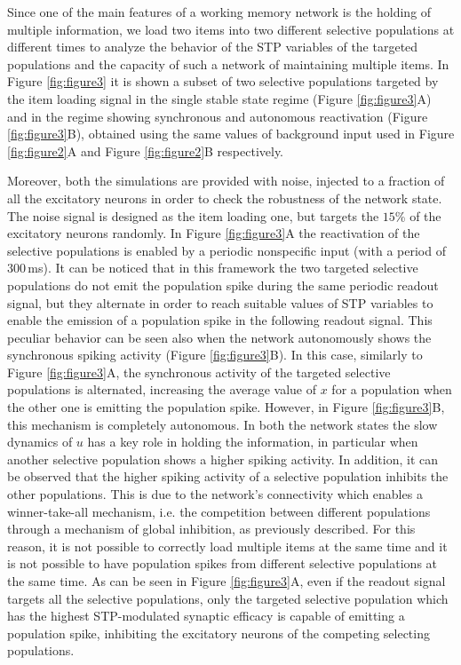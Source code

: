 \documentclass[a4paper, 12pt, twoside, openright]{book}
\begin{document}
Since one of the main features of a working memory network is the holding of multiple information, we load two items into two different selective populations at different times to analyze the behavior of the STP variables of the targeted populations and the capacity of such a network of maintaining multiple items. In Figure \ref{fig:figure3} it is shown a subset of two selective populations targeted by the item loading signal in the single stable state regime (Figure \ref{fig:figure3}A) and in the regime showing synchronous and autonomous reactivation (Figure \ref{fig:figure3}B), obtained using the same values of background input used in Figure \ref{fig:figure2}A and Figure \ref{fig:figure2}B respectively.

Moreover, both the simulations are provided with noise, injected to a fraction of all the excitatory neurons in order to check the robustness of the network state. The noise signal is designed as the item loading one, but targets the $15$\% of the excitatory neurons randomly. In Figure \ref{fig:figure3}A the reactivation of the selective populations is enabled by a periodic nonspecific input (with a period of $300$\,ms). It can be noticed that in this framework the two targeted selective populations do not emit the population spike during the same periodic readout signal, but they alternate in order to reach suitable values of STP variables to enable the emission of a population spike in the following readout signal. This peculiar behavior can be seen also when the network autonomously shows the synchronous spiking activity (Figure \ref{fig:figure3}B). In this case, similarly to Figure \ref{fig:figure3}A, the synchronous activity of the targeted selective populations is alternated, increasing the average value of $x$ for a population when the other one is emitting the population spike. However, in Figure \ref{fig:figure3}B, this mechanism is completely autonomous. In both the network states the slow dynamics of $u$ has a key role in holding the information, in particular when another selective population shows a higher spiking activity. In addition, it can be observed that the higher spiking activity of a selective population inhibits the other populations. This is due to the network’s connectivity which enables a winner-take-all mechanism, i.e. the competition between different populations through a mechanism of global inhibition, as previously described. For this reason, it is not possible to correctly load multiple items at the same time and it is not possible to have population spikes from different selective populations at the same time. As can be seen in Figure \ref{fig:figure3}A, even if the readout signal targets all the selective populations, only the targeted selective population which has the highest STP-modulated synaptic efficacy is capable of emitting a population spike, inhibiting the excitatory neurons of the competing selecting populations.
\end{document}
